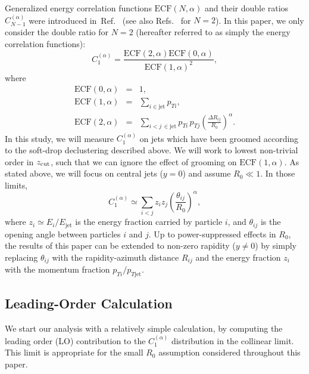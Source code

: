 \documentclass[letterpaper,11pt]{article}
\newcommand{\C}[2]{C^{(#2)}_{#1}}
\newcommand{\ECF}[2]{\text{ECF}\left(#1,#2\right)}
\newcommand{\ea}{{\C{1}{\alpha}}}
\DeclareRobustCommand{\Ref}[1]{Ref.~\cite{#1}}
\DeclareRobustCommand{\Refs}[1]{Refs.~\cite{#1}}
\begin{document}
Generalized energy correlation functions $\ECF{N}{\alpha}$ and their double ratios $\C{N-1}{\alpha}$ were introduced in~\Ref{Larkoski:2013eya} (see also \Refs{Banfi:2004yd,Jankowiak:2011qa} for $N = 2$). In this paper, we only consider the double ratio for $N=2$ (hereafter referred to as simply the energy correlation functions):
\begin{equation}\label{C1b-def}
\C{1}{\alpha}= \frac{\ECF{2}{\alpha} \ECF{0}{\alpha}}{\ECF{1}{\alpha}^2},
\end{equation}
where
\begin{eqnarray} \label{ECF-defs}
\ECF{0}{\alpha}&=& 1, \nonumber \\
\ECF{1}{\alpha}&=& \sum_{i \in  \text{jet}} p_{Ti}, \nonumber \\
\ECF{2}{\alpha}&=& \sum_{i <j \, \in \text{jet}} p_{Ti} \, p_{Tj} \left( \frac{\Delta R_{ij}}{R_0}\right)^\alpha.
\end{eqnarray}
%
In this study, we will measure $\C{1}{\alpha}$ on jets which have been groomed according to the soft-drop declustering described above.  We will work to lowest non-trivial order in $z_{\rm cut}$, such that we can ignore the effect of grooming on $\ECF{1}{\alpha}$.  As stated above, we will focus on central jets ($y = 0$) and assume $R_0 \ll 1$.  In those limits,
\begin{equation}
\C{1}{\alpha} \simeq \sum_{i < j} z_i z_j \left( \frac{\theta_{ij}}{R_0}\right)^\alpha,
\end{equation}
where $z_i \simeq E_i / E_{\text{jet}}$ is the energy fraction carried by particle $i$, and $\theta_{ij}$ is the opening angle between particles $i$ and $j$.  Up to power-suppressed effects in $R_0$, the results of this paper can be extended to non-zero rapidity ($y \not= 0$) by simply replacing $\theta_{ij}$ with the rapidity-azimuth distance $R_{ij}$ and the energy fraction $z_i$ with the momentum fraction $p_{Ti}/ p_{T\text{jet}}$.


\subsection{Leading-Order Calculation}
\label{sec:ang-lo}

We start our analysis with a relatively simple calculation, by computing the leading order (LO) contribution to the $\ea$ distribution in the collinear limit.  This limit is appropriate for the small $R_0$ assumption considered throughout this paper. 
\end{document}
